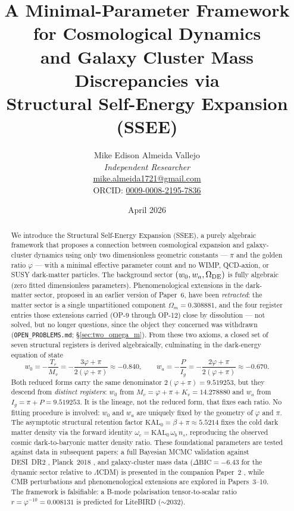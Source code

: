 \documentclass[12pt,a4paper]{article}
\title{\textbf{A Minimal-Parameter Framework for Cosmological Dynamics\\
and Galaxy Cluster Mass Discrepancies via\\
Structural Self-Energy Expansion (SSEE)}}
\author{Mike Edison Almeida Vallejo \\
\small \textit{Independent Researcher} \\
\small \href{mailto:mike.almeida1721@gmail.com}{mike.almeida1721@gmail.com} \\
\small ORCID: \href{https://orcid.org/0009-0008-2195-7836}{0009-0008-2195-7836}
}
\date{April 2026}
\newcommand{\KALz}{\mathrm{KAL}_0}
\begin{document}
\maketitle

\begin{abstract}
We introduce the Structural Self-Energy Expansion (SSEE), a purely algebraic framework that proposes a connection between cosmological expansion and galaxy-cluster dynamics using only two
dimensionless geometric constants — $\pi$ and the golden ratio $\varphi$ — with a
minimal effective parameter count and no WIMP, QCD-axion, or SUSY dark-matter particles.
The background sector $(w_0,w_a,\Omega_{\rm DE})$ is fully algebraic
(zero fitted dimensionless parameters). Phenomenological extensions in the
dark-matter sector, proposed in an earlier version of Paper~6, have been
\emph{retracted}: the matter sector is a single unpartitioned component
$\Omega_m=0.308881$, and the four register entries those extensions carried
(OP-9 through OP-12) close by dissolution --- not solved, but no longer
questions, since the object they concerned was withdrawn
(\texttt{OPEN\_PROBLEMS.md}; \S\ref{sec:two_omega_m}).
From these two axioms, a closed set of seven structural registers is derived algebraically,
culminating in the dark-energy equation of state
\begin{equation*}
  w_0 = -\frac{T_r}{M_v} = -\frac{3\varphi+\pi}{2(\varphi+\pi)} \approx -0.840,
  \qquad
  w_a = -\frac{P}{I_g} = -\frac{2\varphi+\pi}{2(\varphi+\pi)} \approx -0.670.
\end{equation*}
Both reduced forms carry the same denominator $2(\varphi+\pi)=9.519253$, but they descend
from \emph{distinct registers}: $w_0$ from $M_v=\varphi+\pi+K_v=14.278880$ and $w_a$ from
$I_g=\pi+P=9.519253$. It is the lineage, not the reduced form, that fixes each ratio.
No fitting procedure is involved: $w_0$ and $w_a$ are uniquely fixed by the geometry of
$\varphi$ and $\pi$.
The asymptotic structural retention factor $\KALz = \beta + \pi \approx 5.5214$
fixes the cold dark matter density via the forward identity
$\omega_c = \KALz\,\omega_b\,n_s$, reproducing the observed cosmic
dark-to-baryonic matter density ratio.
These foundational parameters are tested against data in subsequent papers: a full Bayesian MCMC validation against DESI~DR2 \citep{AbdulKarim2025},
Planck~2018 \citep{PlanckVI2020}, and galaxy-cluster mass data ($\Delta\mathrm{BIC}=-6.43$ for the dynamic
sector relative to $\Lambda$CDM) is presented in the companion Paper~2 \citep{SSEE_paperII}, while CMB perturbations and phenomenological extensions are explored in Papers~3--10.
The framework is falsifiable: a B-mode polarisation tensor-to-scalar ratio
$r = \varphi^{-10} = 0.008131$ is predicted for LiteBIRD \citep{LiteBIRD2023} ($\sim$2032).
\end{abstract}
\end{document}
